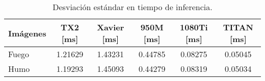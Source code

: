 \begin{table}[]
\centering
\caption{Desviación estándar en tiempo de inferencia. }
\begin{tabular}{lccccc}
\toprule
Imágenes & TX2 {[}ms{]} & Xavier  {[}ms{]} & 950M  {[}ms{]} & 1080Ti  {[}ms{]} & TITAN  {[}ms{]} \\
\midrule
Fuego    & 1.21629      & 1.43231          & 0.44785        & 0.08275          & 0.05045         \\
Humo     & 1.19293      & 1.45093          & 0.44279       & 0.08319        & 0.05034     \\ 
\bottomrule
\end{tabular}
\label{desv-fuego}
\end{table}
